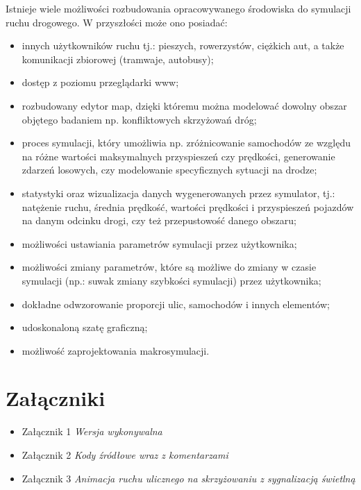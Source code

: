 \documentclass{sprawozdanie-agh}
\begin{document}
	Istnieje wiele możliwości rozbudowania opracowywanego środowiska do symulacji ruchu drogowego. W przyszłości może ono posiadać:
	\begin{itemize}
		\item innych użytkowników ruchu tj.: pieszych, rowerzystów, ciężkich aut, a także komunikacji zbiorowej (tramwaje, autobusy);
		\item dostęp z poziomu przeglądarki www;
		\item rozbudowany edytor map, dzięki któremu można modelować dowolny obszar objętego badaniem np. konfliktowych skrzyżowań dróg;
		\item proces symulacji, który umożliwia np. zróżnicowanie samochodów ze względu na różne wartości maksymalnych przyspieszeń czy prędkości, generowanie zdarzeń losowych, czy modelowanie specyficznych sytuacji na drodze;
		\item statystyki oraz wizualizacja danych wygenerowanych przez symulator, tj.: natężenie ruchu, średnia prędkość, wartości prędkości i przyspieszeń pojazdów na danym odcinku drogi, czy też przepustowość danego obszaru;
		\item możliwości ustawiania parametrów symulacji przez użytkownika;
		\item możliwości zmiany parametrów, które są możliwe do zmiany w czasie symulacji (np.: suwak zmiany szybkości symulacji) przez użytkownika;
		\item dokładne odwzorowanie proporcji ulic, samochodów i innych elementów;
		\item udoskonaloną szatę graficzną;
		\item możliwość zaprojektowania makrosymulacji.
	\end{itemize}

	\newpage
	\section{Załączniki}

	\begin{itemize}
		\item Załącznik 1 \textit{Wersja wykonywalna}
		\item Załącznik 2 \textit{Kody źródłowe wraz z komentarzami}
		\item Załącznik 3 \textit{Animacja ruchu ulicznego na skrzyżowaniu z sygnalizacją świetlną}
	\end{itemize}
	\newpage

	{} 
	
\end{document}
